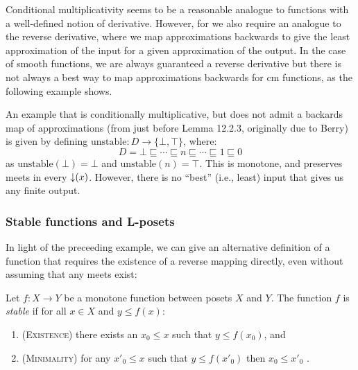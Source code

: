 Conditional multiplicativity seems to be a reasonable analogue to functions with a well-defined notion of derivative. However, for \GPS we also require an analogue to the reverse derivative, where we map approximations backwards to give the least approximation of the input for a given approximation of the output. In the case of smooth functions, we are always guaranteed a reverse derivative but there is not always a best way to map approximations backwards for cm functions, as the following example shows.

\begin{example}
  \label{ex:non-stable-function}
  An example that is conditionally multiplicative, but does not admit a backards map of approximations (from \citet{amadio-curien} just before Lemma 12.2.3, originally due to Berry) is given by defining $\mathrm{unstable} : D \to \{\bot, \top\}$, where:
  \begin{displaymath}
    D = \bot \sqsubseteq \cdots \sqsubseteq n \sqsubseteq \cdots \sqsubseteq 1 \sqsubseteq 0
  \end{displaymath}
  as $\mathrm{unstable}(\bot) = \bot$ and $\mathrm{unstable}(n) = \top$. This is monotone, and preserves meets in every $\mathop{\downarrow}(x)$. However, there is no ``best'' (i.e., least) input that gives us any finite output.
\end{example}

\subsubsection{Stable functions and L-posets}

In light of the preceeding example, we can give an alternative
definition of a function that requires the existence of a reverse
mapping directly, even without assuming that any meets exist:

\begin{definition}
  Let $f : X \to Y$ be a monotone function between posets $X$ and
  $Y$. The function $f$ is \emph{stable} if for all $x \in X$ and
  $y \leq f(x)$:
  \begin{enumerate}
  \item (\textsc{Existence}) there exists an $x_0 \leq x$ such that $y \leq f(x_0)$, and
  \item (\textsc{Minimality}) for any $x'_0 \leq x$ such that $y \leq f(x'_0)$ then
    $x_0 \leq x'_0$ .
  \end{enumerate}
\end{definition}

